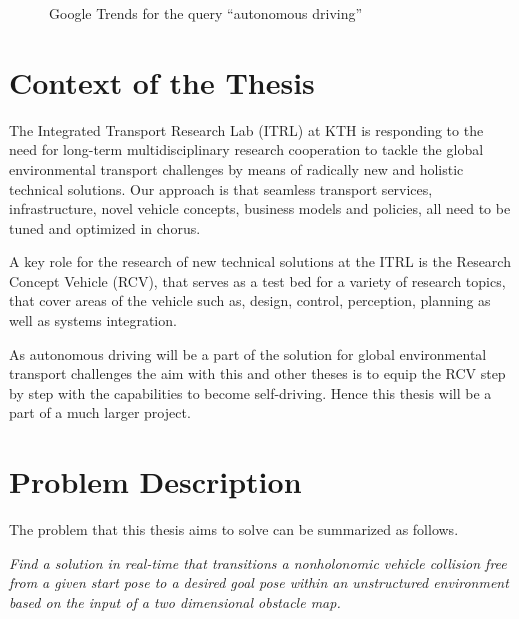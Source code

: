 \begin{figure}[h]
\caption{Google Trends for the query ``autonomous driving''}
\label{fig:googleTrends}
\end{figure}

\section{Context of the Thesis}
The Integrated Transport Research Lab (ITRL) at KTH is responding to the need for long-term multidisciplinary research cooperation to tackle the global environmental transport challenges by means of radically new and holistic technical solutions. Our approach is that seamless transport services, infrastructure, novel vehicle concepts, business models and policies, all need to be tuned and optimized in chorus.

A key role for the research of new technical solutions at the ITRL is the Research Concept Vehicle (RCV), that serves as a test bed for a variety of research topics, that cover areas of the vehicle such as, design, control, perception, planning as well as systems integration.

As autonomous driving will be a part of the solution for global environmental transport challenges the aim with this and other theses is to equip the RCV step by step with the capabilities to become self-driving. Hence this thesis will be a part of a much larger project.

\section{Problem Description}
The problem that this thesis aims to solve can be summarized as follows.

\emph{Find a solution in real-time that transitions a nonholonomic vehicle collision free from a given start pose to a desired goal pose within an unstructured environment based on the input of a two dimensional obstacle map.}

